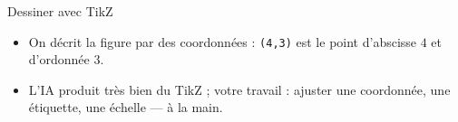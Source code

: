 \begin{frame}[fragile]{Dessiner avec TikZ}
\begin{CodeRendu}[title={Un triangle rectangle}]
\end{CodeRendu}
  \small
  \begin{itemize}
    \item On décrit la figure par des coordonnées : \texttt{(4,3)} est le
      point d'abscisse $4$ et d'ordonnée $3$.
    \item L'IA produit très bien du TikZ ; votre travail : ajuster une
      coordonnée, une étiquette, une échelle --- à la main.
  \end{itemize}
\end{frame}

